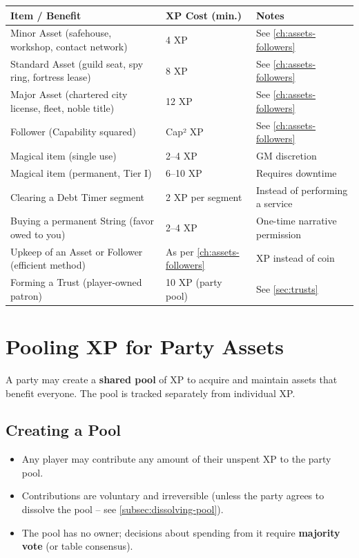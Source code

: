 \begin{center}
\begin{tabular}{lll}
\toprule
\textbf{Item / Benefit} & \textbf{XP Cost (min.)} & \textbf{Notes} \\
\midrule
Minor Asset (safehouse, workshop, contact network) & 4 XP & See \ref{ch:assets-followers} \\
Standard Asset (guild seat, spy ring, fortress lease) & 8 XP & See \ref{ch:assets-followers} \\
Major Asset (chartered city license, fleet, noble title) & 12 XP & See \ref{ch:assets-followers} \\
Follower (Capability squared) & Cap² XP & See \ref{ch:assets-followers} \\
Magical item (single use) & 2--4 XP & GM discretion \\
Magical item (permanent, Tier I) & 6--10 XP & Requires downtime \\
Clearing a Debt Timer segment & 2 XP per segment & Instead of performing a service \\
Buying a permanent String (favor owed to you) & 2--4 XP & One-time narrative permission \\
Upkeep of an Asset or Follower (efficient method) & As per \ref{ch:assets-followers} & XP instead of coin \\
Forming a Trust (player-owned patron) & 10 XP (party pool) & See \ref{sec:trusts} \\
\bottomrule
\end{tabular}
\end{center}

\section{Pooling XP for Party Assets}
\label{sec:party-pool}

A party may create a \textbf{shared pool} of XP to acquire and maintain assets that benefit everyone. The pool is tracked separately from individual XP.

\subsection{Creating a Pool}
\label{subsec:creating-pool}

\begin{itemize}
  \item Any player may contribute any amount of their unspent XP to the party pool.
  \item Contributions are voluntary and irreversible (unless the party agrees to dissolve the pool -- see \ref{subsec:dissolving-pool}).
  \item The pool has no owner; decisions about spending from it require \textbf{majority vote} (or table consensus).
\end{itemize}

